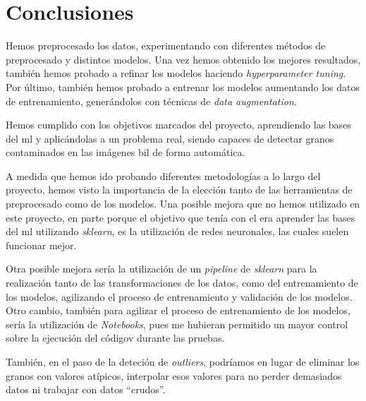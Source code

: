 \section{Conclusiones}

Hemos preprocesado los datos, experimentando con diferentes métodos de preprocesado y distintos modelos. Una vez hemos obtenido los mejores resultados, también hemos probado a refinar los modelos haciendo \textit{hyperparameter tuning}. Por último, también hemos probado a entrenar los modelos aumentando los datos de entrenamiento, generándolos con técnicas de \textit{data augmentation}.

Hemos cumplido con los objetivos marcados del proyecto, aprendiendo las bases del \gls{ml} y aplicándolas a un problema real, siendo capaces de detectar granos contaminados en las imágenes \gls{bil} de forma automática.

A medida que hemos ido probando diferentes metodologías a lo largo del proyecto, hemos visto la importancia de la elección tanto de las herramientas de preprocesado como de los modelos.
Una posible mejora que no hemos utilizado en este proyecto, en parte porque el objetivo que tenía con el era aprender las bases del \gls{ml} utilizando \textit{sklearn}, es la utilización de redes neuronales, las cuales suelen funcionar mejor.

Otra posible mejora sería la utilización de un \textit{pipeline} de \textit{sklearn} para la realización tanto de las transformaciones de los datos, como del entrenamiento de los modelos, agilizando el proceso de entrenamiento y validación de los modelos. Otro cambio, también para agilizar el proceso de entrenamiento de los modelos, sería la utilización de \textit{Notebooks}, pues me hubieran permitido un mayor control sobre la ejecución del códigov durante las pruebas.

También, en el paso de la deteción de \textit{outliers}, podríamos en lugar de eliminar los granos con valores atípicos, interpolar esos valores para no perder demasiados datos ni trabajar con datos ``crudos''.